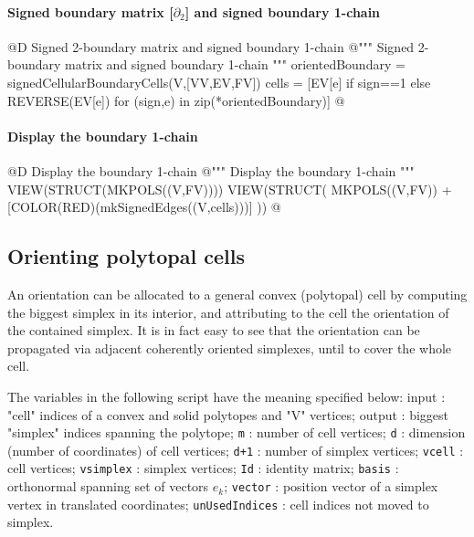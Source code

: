 \documentclass[11pt,oneside]{article}    %
\begin{document}
\paragraph{Signed boundary matrix [$\partial_2$] and signed boundary 1-chain}
@D Signed 2-boundary matrix and signed boundary 1-chain
@{""" Signed 2-boundary matrix  and signed boundary 1-chain """
orientedBoundary = signedCellularBoundaryCells(V,[VV,EV,FV])
cells = [EV[e] if sign==1 else REVERSE(EV[e]) for (sign,e) in zip(*orientedBoundary)]
@}

\paragraph{Display the boundary 1-chain}
@D Display the boundary 1-chain
@{""" Display the boundary 1-chain """
VIEW(STRUCT(MKPOLS((V,FV))))
VIEW(STRUCT(
    MKPOLS((V,FV)) +
    [COLOR(RED)(mkSignedEdges((V,cells)))]  ))
@}



\subsection{Orienting polytopal cells}

An orientation can be allocated to a general convex (polytopal) cell by computing the biggest simplex in its interior, and attributing to the cell the orientation of the contained simplex. 
It is in fact easy to see that the orientation can be propagated via adjacent coherently oriented simplexes, until to cover the whole cell.

The variables in the following script have the meaning specified below:
{input} :  "cell" indices of a convex and solid polytopes and "V" vertices;
{output} :  biggest "simplex" indices spanning the polytope;
{\tt m} : number of cell vertices;
{\tt d} : dimension (number of coordinates) of cell vertices;
{\tt d+1} : number of simplex vertices;
{\tt vcell} : cell vertices;
{\tt vsimplex} : simplex vertices;
{\tt Id} : identity matrix;
{\tt basis} : orthonormal spanning set of vectors $e_k$;
{\tt vector} : position vector of a simplex vertex in translated coordinates;
{\tt unUsedIndices} : cell indices not moved to simplex.
\end{document}
